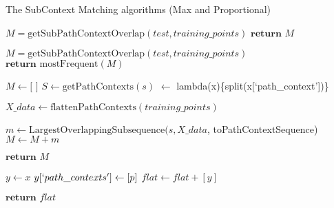 \begin{algorithm}
    \caption{The SubContext Matching algorithms (Max and Proportional)}



    \label{alg:sub_context_algorithm}
    \begin{algorithmic}
        \State ${M} = \text{getSubPathContextOverlap}(test, training\_points)$
        \State $\textbf{return } M$
        \EndProcedure
    \end{algorithmic}
    \hrulefill
    \begin{algorithmic}
        \State ${M} = \text{getSubPathContextOverlap}(test, training\_points)$
        \State $\textbf{return } \text{mostFrequent}(M)$
        \EndProcedure
    \end{algorithmic}
    \hrulefill

    \begin{algorithmic}
        \State ${M} \gets \textbf{[ ]}$
        \State ${S} \gets \text{getPathContexts}(s)$
        \State {} $\gets$ lambda(x)\{split(x[`path\_context'])\}

        \State ${X\_data} \gets \text{flattenPathContexts}(training\_points)$

            \State $m \gets \text{LargestOverlappingSubsequence}(s, X\_data$, toPathContextSequence) 
            \State $M \gets M + m$

        \EndFor
        \State $\textbf{return } M$
        \EndProcedure
    \end{algorithmic}
    \hrulefill
    \begin{algorithmic}
                \State $y \gets x$
                \State $y[`path\_contexts'] \gets [p]$
                \State $flat \gets flat + [y]$
            \EndFor
        \EndFor

        \State $\textbf{return }flat$
        \EndProcedure
    \end{algorithmic}
\end{algorithm}





